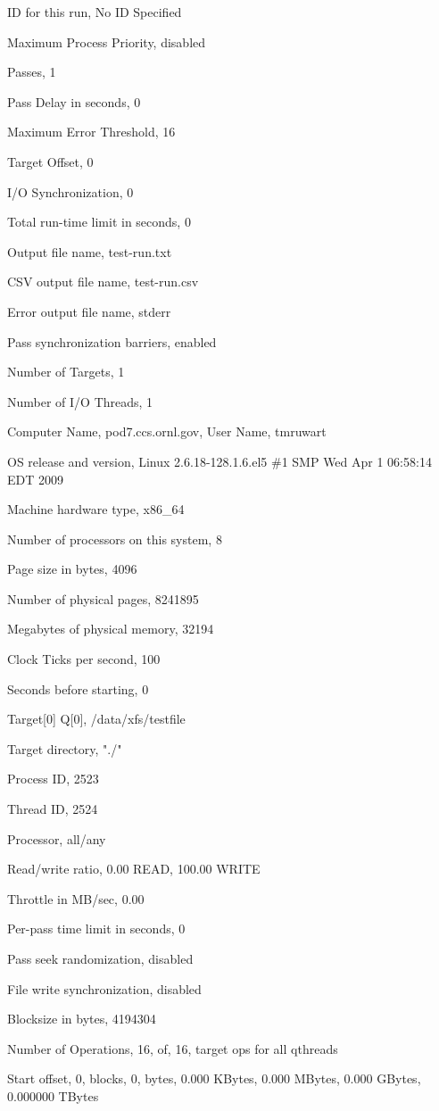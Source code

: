 ID for this run, \textquotesingle No ID Specified\textquotesingle{}

Maximum Process Priority, disabled

Passes, 1

Pass Delay in seconds, 0

Maximum Error Threshold, 16

Target Offset, 0

I/O Synchronization, 0

Total run-time limit in seconds, 0

Output file name, test-run.txt

CSV output file name, test-run.csv

Error output file name, stderr

Pass synchronization barriers, enabled

Number of Targets, 1

Number of I/O Threads, 1

Computer Name, pod7.ccs.ornl.gov, User Name, tmruwart

OS release and version, Linux 2.6.18-128.1.6.el5 \#1 SMP Wed Apr 1 06:58:14 EDT 2009

Machine hardware type, x86\_64

Number of processors on this system, 8

Page size in bytes, 4096

Number of physical pages, 8241895

Megabytes of physical memory, 32194

Clock Ticks per second, 100

Seconds before starting, 0

Target{[}0{]} Q{[}0{]}, /data/xfs/testfile

Target directory, "./"

Process ID, 2523

Thread ID, 2524

Processor, all/any

Read/write ratio, 0.00 READ, 100.00 WRITE

Throttle in MB/sec, 0.00

Per-pass time limit in seconds, 0

Pass seek randomization, disabled

File write synchronization, disabled

Blocksize in bytes, 4194304

Number of Operations, 16, of, 16, target ops for all qthreads

Start offset, 0, blocks, 0, bytes, 0.000 KBytes, 0.000 MBytes, 0.000 GBytes, 0.000000 TBytes

